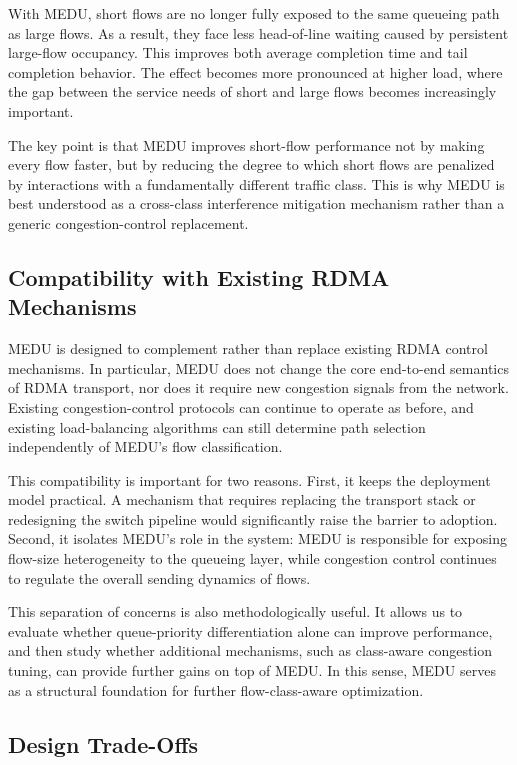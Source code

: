 \documentclass[conference]{IEEEtran}
\begin{document}
With MEDU, short flows are no longer fully exposed to the same queueing path as large flows. As a result, they face less head-of-line waiting caused by persistent large-flow occupancy. This improves both average completion time and tail completion behavior. The effect becomes more pronounced at higher load, where the gap between the service needs of short and large flows becomes increasingly important.

The key point is that MEDU improves short-flow performance not by making every flow faster, but by reducing the degree to which short flows are penalized by interactions with a fundamentally different traffic class. This is why MEDU is best understood as a cross-class interference mitigation mechanism rather than a generic congestion-control replacement.

\subsection{Compatibility with Existing RDMA Mechanisms}

MEDU is designed to complement rather than replace existing RDMA control mechanisms. In particular, MEDU does not change the core end-to-end semantics of RDMA transport, nor does it require new congestion signals from the network. Existing congestion-control protocols can continue to operate as before, and existing load-balancing algorithms can still determine path selection independently of MEDU's flow classification.

This compatibility is important for two reasons. First, it keeps the deployment model practical. A mechanism that requires replacing the transport stack or redesigning the switch pipeline would significantly raise the barrier to adoption. Second, it isolates MEDU's role in the system: MEDU is responsible for exposing flow-size heterogeneity to the queueing layer, while congestion control continues to regulate the overall sending dynamics of flows.

This separation of concerns is also methodologically useful. It allows us to evaluate whether queue-priority differentiation alone can improve performance, and then study whether additional mechanisms, such as class-aware congestion tuning, can provide further gains on top of MEDU. In this sense, MEDU serves as a structural foundation for further flow-class-aware optimization.

\subsection{Design Trade-Offs}
\end{document}
